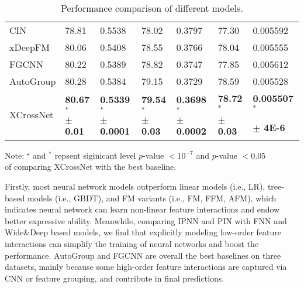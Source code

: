 \documentclass[letterpaper]{article} \usepackage{aaai21}  \usepackage{times}  \usepackage{helvet} \usepackage{courier}  \usepackage[hyphens]{url}  \usepackage{graphicx} \urlstyle{rm} \def\UrlFont{\rm}  \usepackage{natbib}  \usepackage{caption} \frenchspacing  \setlength{\pdfpagewidth}{8.5in}  \setlength{\pdfpageheight}{11in}  \usepackage{graphicx}
\begin{document}
\begin{table}[t]
{\begin{tabular}{p{1.25cm} <{\centering}|p{0.75cm} <{\centering} p{0.8cm} <{\centering}|p{0.75cm} <{\centering} p{0.83cm} <{\centering}|p{0.7cm} <{\centering} p{0.9cm} <{\centering}}
CIN                     & 78.81                   & 0.5538                    & 78.02                    & 0.3797                    & 77.30                    & 0.005592                    \\
xDeepFM                      & 80.06                    & 0.5408                    & 78.55                   & 0.3766                    & 78.04                    & 0.005555                    \\
FGCNN                      & 80.22                    & 0.5389                    & 78.82                   & 0.3747                   & 77.85                    & 0.005612                   \\
AutoGroup                      & 80.28                    & 0.5384                    & 79.15                    & 0.3729                    & 78.59                   & 0.005528                    \\
	\hline
		\multirow{2}{*}{XCrossNet}                     & \textbf{80.67$^\star$}                    & \textbf{0.5339$^\star$}                   & \textbf{79.54$^\star$}                    & \textbf{0.3698$^\star$}                    & \textbf{78.72$^*$}                    & \textbf{0.005507$^*$}                    \\
		& \textbf{$\pm$0.01} & \textbf{$\pm$0.0001} & \textbf{$\pm$0.03} & \textbf{$\pm$0.0002} & \textbf{$\pm$0.03} &\textbf{$\pm$ 4E-6} \\
	\hline
	\hline
	
	\end{tabular}
}

Note: $^\star$ and $^*$ repsent siginicant level $p$-value $<10^{-7}$ and $p$-value $<0.05$ \\ of comparing XCrossNet with the best baseline.
	\vspace{-0.2cm}
	\caption{Performance comparison of different models.}
	\label{table3}
	\vspace{-0.6cm}
\end{table}

Firstly, most neural network models outperform linear models (i.e., LR), tree-based models (i.e., GBDT), and FM variants (i.e., FM, FFM, AFM), which indicates neural network can learn non-linear feature interactions and endow better expressive ability. Meanwhile, comparing IPNN and PIN with FNN and Wide\&Deep based models, we find that explicitly modeling low-order feature interactions can simplify the training of neural networks and boost the performance. AutoGroup and FGCNN are overall the best baselines on three datasets, mainly because some high-order feature interactions are captured via CNN or feature grouping, and contribute in final predictions.
\end{document}
